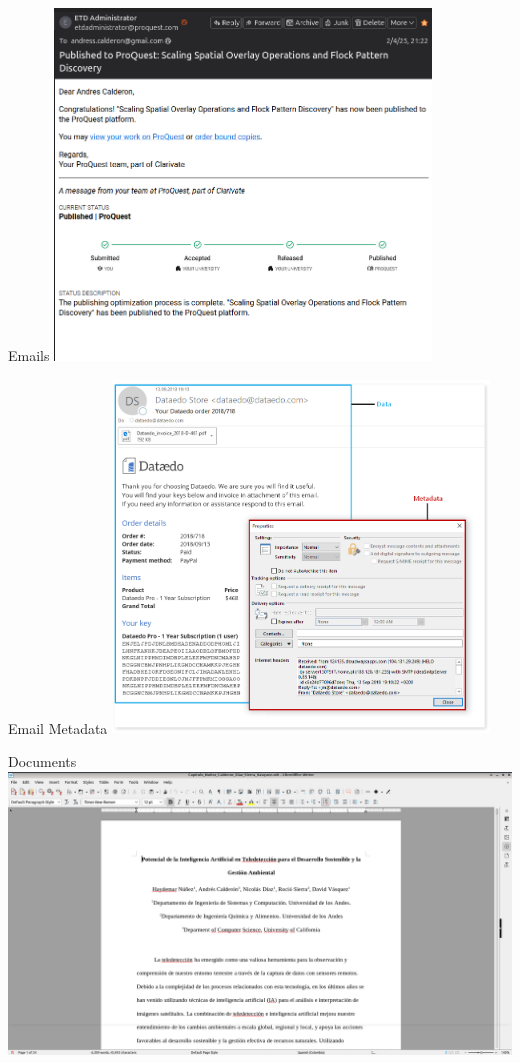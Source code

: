 \documentclass{beamer}
\begin{document}
\begin{frame}{Emails}
    \centering
    \includegraphics[width=0.75\textwidth]{figures/email}
\end{frame}
\begin{frame}{Email Metadata}
    \centering
    \includegraphics[width=0.75\textwidth]{figures/emailmeta}
\end{frame}
\begin{frame}{Documents}
    \centering
    \includegraphics[width=\textwidth]{figures/document}
\end{frame}
\end{document}
